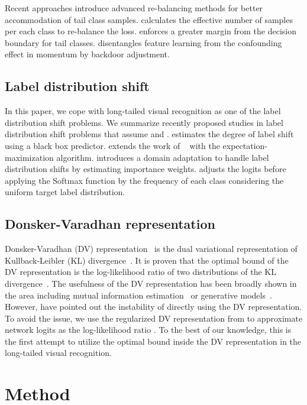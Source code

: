 \documentclass[final]{cvpr}
\begin{document}
Recent approaches introduce advanced re-balancing methods for better accommodation of tail class samples.
\cite{cui2019class} calculates the effective number of samples per each class to re-balance the loss.
\cite{cao2019learning} enforces a greater margin from the decision boundary for tail classes.
\cite{tang2020long} disentangles feature learning from the confounding effect in momentum by backdoor adjustment.

\subsection{Label distribution shift}\label{subsec:2_2_label_distribution_shift}
In this paper, we cope with long-tailed visual recognition as one of the label distribution shift problems.
We summarize recently proposed studies in label distribution shift problems that assume  and .
\cite{lipton2018detecting} estimates the degree of label shift using a black box predictor. 
\cite{garg2020unified} extends the work of ~\cite{lipton2018detecting} with the expectation-maximization algorithm.
\cite{azizzadenesheli2019regularized} introduces a domain adaptation to handle label distribution shifts by estimating importance weights.
\cite{ren2020balanced} adjusts the logits before applying the Softmax function by the frequency of each class considering the uniform target label distribution.

\subsection{Donsker-Varadhan representation}\label{subsec:2_2_Donsker_Varadhan_Loss_Function}
Donsker-Varadhan (DV) representation~\cite{donsker1985large} is the dual variational representation of Kullback-Leibler (KL) divergence~\cite{kullback1951information}. 
It is proven that the optimal bound of the DV representation is the log-likelihood ratio of two distributions of the KL divergence~\cite{banerjee2006bayesian,belghazi2018mutual}.
The usefulness of the DV representation has been broadly shown in the area including mutual information estimation~\cite{belghazi2018mutual,lin2019data,poole2019variational} or generative models~\cite{belghazi2018mutual,nowozin2016f}.
However, \cite{song2019understanding,choi2020regularized,mcallester2020formal} have pointed out the instability of directly using the DV representation.
To avoid the issue, we use the regularized DV representation from \cite{choi2020regularized} to approximate network logits as the log-likelihood ratio .
To the best of our knowledge, this is the first attempt to utilize the optimal bound inside the DV representation in the long-tailed visual recognition. \section{Method}\label{sec:3_method}
\end{document}
